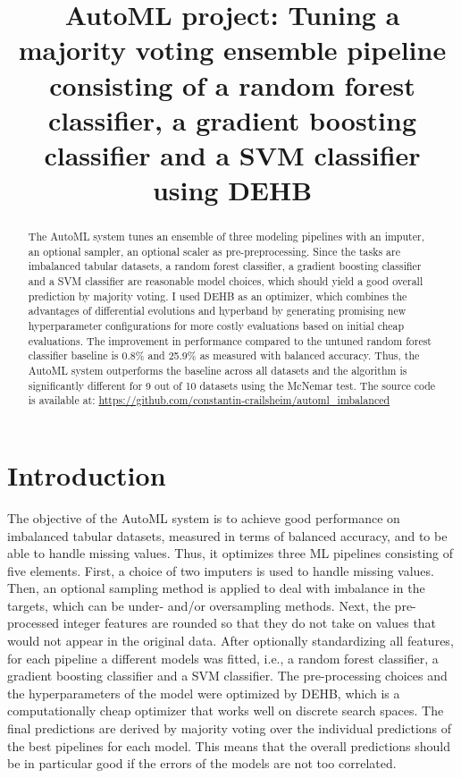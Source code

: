 \documentclass[11pt]{article}
\title{AutoML project: Tuning a majority voting ensemble pipeline consisting of a random forest classifier, a gradient boosting classifier and a SVM classifier using DEHB}
\author[1]{\nameemail{Constantin von Crailsheim}{C.Crailsheim@campus.lmu.de}}
\affil[1]{LMU Munich, Institute of Statistics}
\begin{document}
\maketitle

\begin{abstract}
The AutoML system tunes an ensemble of three modeling pipelines with an imputer, an optional sampler, an optional scaler as pre-preprocessing. Since the tasks are imbalanced tabular datasets, a random forest classifier, a gradient boosting classifier and a SVM classifier are reasonable model choices, which should yield a good overall prediction by majority voting. I used DEHB as an optimizer, which combines the advantages of differential evolutions and hyperband by generating promising new hyperparameter configurations for more costly evaluations based on initial cheap evaluations. The improvement in performance compared to the untuned random forest classifier baseline is 0.8\% and 25.9\% as measured with balanced accuracy. Thus, the AutoML system outperforms the baseline across all datasets and the algorithm is significantly different for 9 out of 10 datasets using the McNemar test. The source code is available at: \url{https://github.com/constantin-crailsheim/automl_imbalanced}
\end{abstract}



\section{Introduction}

The objective of the AutoML system is to achieve good performance on imbalanced tabular datasets, measured in terms of balanced accuracy, and to be able to handle missing values. Thus, it optimizes three ML pipelines consisting of five elements. First, a choice of two imputers is used to handle missing values. Then, an optional sampling method is applied to deal with imbalance in the targets, which can be under- and/or oversampling methods. Next, the pre-processed integer features are rounded so that they do not take on values that would not appear in the original data. After optionally standardizing all features, for each pipeline a different models was fitted, i.e., a random forest classifier, a gradient boosting classifier and a SVM classifier. The pre-processing choices and the hyperparameters of the model were optimized by DEHB, which is a computationally cheap optimizer that works well on discrete search spaces. The final predictions are derived by majority voting over the individual predictions of the best pipelines for each model. This means that the overall predictions should be in particular good if the errors of the models are not too correlated.
\end{document}
